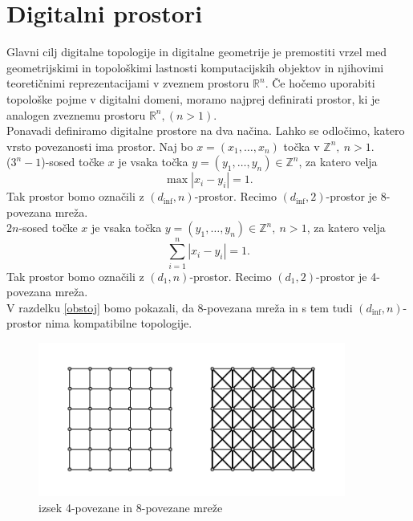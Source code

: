 \documentclass[a4paper, 12pt]{book}
\theoremstyle{definition}
\theoremstyle{remark}
\begin{document}
\chapter{Digitalni prostori}
Glavni cilj digitalne topologije in digitalne geometrije je premostiti vrzel
med geometrijskimi in topološkimi lastnosti komputacijskih objektov in njihovimi
teoretičnimi reprezentacijami v zveznem prostoru $\mathbb{R}^n$. Če hočemo uporabiti
topološke pojme v digitalni domeni, moramo najprej definirati prostor, ki je
analogen zveznemu prostoru $\mathbb{R}^n, (n > 1)$.\\
Ponavadi definiramo digitalne prostore na dva načina. Lahko se odločimo, katero 
vrsto povezanosti ima prostor. Naj bo $x = (x_1,\dots,x_n)$
točka v $\mathbb{Z}^n,\ n > 1$.\\
  ($3^n-1$)-sosed točke $x$ je vsaka točka
  $y = (y_1,\dots,y_n) \in \mathbb{Z}^n$, za katero velja
  \[
    \max|x_i - y_i| = 1 \text{.}
  \]
  Tak prostor bomo označili z $(d_{\inf},n)$-prostor.
  Recimo $(d_{\inf},2)$-prostor je 8-povezana mreža.\\
  $2n$-sosed točke $x$ je vsaka točka $y = (y_1,\dots,y_n) \in \mathbb{Z}^n,\ n > 1$,
  za katero velja
  \[
    \sum_{i=1}^{n}|x_i - y_i| = 1 \text{.}
  \]
  Tak prostor bomo označili z $(d_1,n)$-prostor.
  Recimo $(d_1,2)$-prostor je 4-povezana mreža.\\
  V razdelku \ref{obstoj} bomo pokazali, da 8-povezana mreža in s tem tudi
  $(d_{\inf},n)$-prostor nima kompatibilne topologije.

\begin{figure}[h]
  \begin{center}
  \includegraphics[width=0.9\textwidth]{4mreza8mreza.pdf}
  \end{center}
  \caption{izsek 4-povezane in 8-povezane mreže}
\end{figure}
\end{document}
